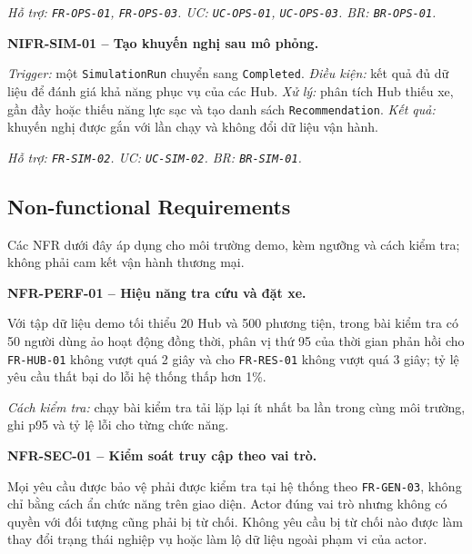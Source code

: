 \textit{Hỗ trợ: \texttt{FR-OPS-01}, \texttt{FR-OPS-03}. UC: \texttt{UC-OPS-01}, \texttt{UC-OPS-03}. BR: \texttt{BR-OPS-01}.}

\medskip
\noindent\textbf{NIFR-SIM-01 -- Tạo khuyến nghị sau mô phỏng.}\par
\nopagebreak[4]
\textit{Trigger:} một \texttt{SimulationRun} chuyển sang \texttt{Completed}. \textit{Điều kiện:} kết quả đủ dữ liệu để đánh giá khả năng phục vụ của các Hub. \textit{Xử lý:} phân tích Hub thiếu xe, gần đầy hoặc thiếu năng lực sạc và tạo danh sách \texttt{Recommendation}. \textit{Kết quả:} khuyến nghị được gắn với lần chạy và không đổi dữ liệu vận hành.

\textit{Hỗ trợ: \texttt{FR-SIM-02}. UC: \texttt{UC-SIM-02}. BR: \texttt{BR-SIM-01}.}

\subsection{Non-functional Requirements}

Các NFR dưới đây áp dụng cho môi trường demo, kèm ngưỡng và cách kiểm tra; không phải cam kết vận hành thương mại.

\noindent\textbf{NFR-PERF-01 -- Hiệu năng tra cứu và đặt xe.}\par
\nopagebreak[4]
Với tập dữ liệu demo tối thiểu 20 Hub và 500 phương tiện, trong bài kiểm tra có 50 người dùng ảo hoạt động đồng thời, phân vị thứ 95 của thời gian phản hồi cho \texttt{FR-HUB-01} không vượt quá 2 giây và cho \texttt{FR-RES-01} không vượt quá 3 giây; tỷ lệ yêu cầu thất bại do lỗi hệ thống thấp hơn 1\%.

\textit{Cách kiểm tra:} chạy bài kiểm tra tải lặp lại ít nhất ba lần trong cùng môi trường, ghi p95 và tỷ lệ lỗi cho từng chức năng.

\medskip
\noindent\textbf{NFR-SEC-01 -- Kiểm soát truy cập theo vai trò.}\par
\nopagebreak[4]
Mọi yêu cầu được bảo vệ phải được kiểm tra tại hệ thống theo \texttt{FR-GEN-03}, không chỉ bằng cách ẩn chức năng trên giao diện. Actor đúng vai trò nhưng không có quyền với đối tượng cũng phải bị từ chối. Không yêu cầu bị từ chối nào được làm thay đổi trạng thái nghiệp vụ hoặc làm lộ dữ liệu ngoài phạm vi của actor.

